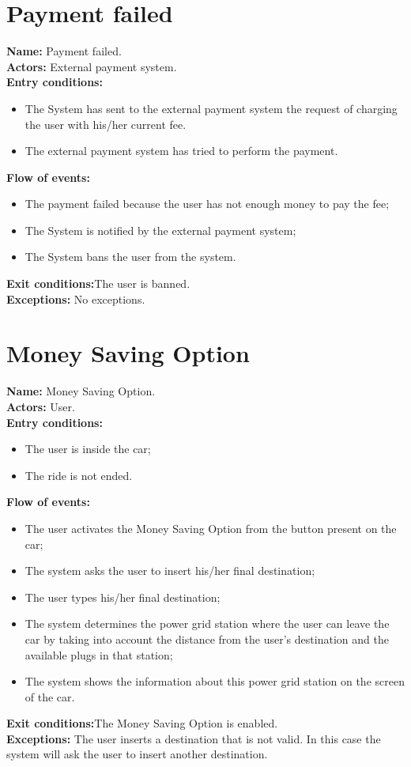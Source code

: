 \section*{Payment failed}
\textbf{Name:} Payment failed.\\
\textbf{Actors:} External payment system.\\
\textbf{Entry conditions:}
\begin{itemize}
\item The System has sent to the external payment system the request of charging the user with his/her current fee.
\item The external payment system has tried to perform the payment.
\end{itemize}
\textbf{Flow of events:}
\begin{itemize}
\item The payment failed because the user has not enough money to pay the fee;
\item The System is notified by the external payment system;
\item The System bans the user from the system.
\end{itemize}
\textbf{Exit conditions:}The user is banned.\\
\textbf{Exceptions:} No exceptions.

\section*{Money Saving Option}
\textbf{Name:} Money Saving Option.\\
\textbf{Actors:} User.\\
\textbf{Entry conditions:}
\begin{itemize}
\item The user is inside the car;
\item The ride is not ended.
\end{itemize}
\textbf{Flow of events:}
\begin{itemize}
\item The user activates the Money Saving Option from the button present on the car;
\item The system asks the user to insert his/her final destination;
\item The user types his/her final destination;
\item The system determines the power grid station where the user can leave the car by taking into account the distance from the user's destination and the available plugs in that station;
\item The system shows the information about this power grid station on the screen of the car.
\end{itemize}
\textbf{Exit conditions:}The Money Saving Option is enabled.\\
\textbf{Exceptions:} 
The user inserts a destination that is not valid. In this case the system will ask the user to insert another destination.
